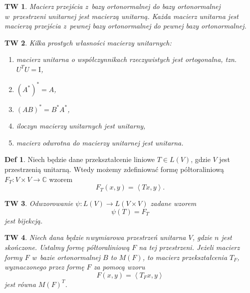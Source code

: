 \documentclass[a4paper, 12pt]{mwart}
\newcommand*{\im}{\mathrm{I}}
\theoremstyle{definition}
\newtheorem{definicja}{Def}[section]
\theoremstyle{plain}
\newtheorem{twierdzenie}{TW}[section]
\theoremstyle{remark}
\begin{document}
\begin{twierdzenie}
	Macierz przejścia z~bazy ortonormalnej do bazy ortonormalnej w~przestrzeni unitarnej jest macierzą unitarną. Każda macierz unitarna jest macierzą przejścia z~pewnej bazy ortonormalnej do pewnej bazy ortonormalnej.
\end{twierdzenie}
\begin{twierdzenie}
	Kilka prostych własności macierzy unitarnych:
	\begin{enumerate}
		\item macierz unitarna o współczynnikach rzeczywistych jest ortogonalna, tzn. $U^TU = \im$,
		\item ${\left(A^*\right)}^* = A$,
		\item ${\left(AB\right)}^* = B^*A^*$,
		\item iloczyn macierzy unitarnych jest unitarny,
		\item macierz odwrotna do macierzy unitarnej jest unitarna.
	\end{enumerate}
\end{twierdzenie}
\begin{definicja}
	Niech będzie dane przekształcenie liniowe $T \in L(V)$, gdzie $V$ jest przestrzenią unitarną. Wtedy możemy zdefiniować formę półtoraliniową $F_T\colon V\times V\to \mathbb{C}$ wzorem
	\begin{equation}
		F_T(x, y) = \left<Tx, y\right>.
	\end{equation}
\end{definicja}
\begin{twierdzenie}
	Odwzorowanie $\psi\colon L(V)\to L(V\times V)$ zadane wzorem
	\begin{equation}
		\psi(T) = F_T
	\end{equation}
	jest bijekcją.
\end{twierdzenie}
\begin{twierdzenie}
	Niech dana będzie $n$\dywiz wymiarowa przestrzeń unitarna $V$, gdzie $n$ jest skończone. Ustalmy formę półtoraliniową $F$ na tej przestrzeni.
	Jeżeli macierz formy $F$ w~bazie ortonormalnej $B$ to $M(F)$, to macierz przekształcenia $T_F$, wyznaczonego przez formę $F$ za pomocą wzoru
	\begin{equation}
		F(x, y) = \left<T_F x, y\right>
	\end{equation} jest równa ${M(F)}^T$.
\end{twierdzenie}
\end{document}
